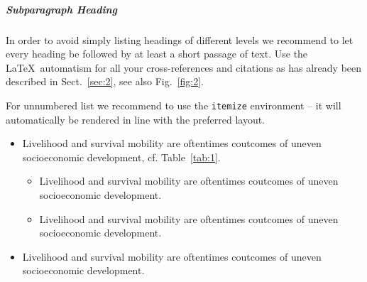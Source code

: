 \documentclass[graybox]{svmult}
\begin{document}
\subparagraph{Subparagraph Heading} In order to avoid simply listing headings of different levels we recommend to let every heading be followed by at least a short passage of text. Use the \LaTeX\ automatism for all your cross-references and citations as has already been described in Sect.~\ref{sec:2}, see also Fig.~\ref{fig:2}.

For unnumbered list we recommend to use the \verb|itemize| environment -- it will automatically be rendered in line with the preferred layout.

\begin{itemize}
\item{Livelihood and survival mobility are oftentimes coutcomes of uneven socioeconomic development, cf. Table~\ref{tab:1}.}
\begin{itemize}
\item{Livelihood and survival mobility are oftentimes coutcomes of uneven socioeconomic development.}
\item{Livelihood and survival mobility are oftentimes coutcomes of uneven socioeconomic development.}
\end{itemize}
\item{Livelihood and survival mobility are oftentimes coutcomes of uneven socioeconomic development.}
\end{itemize}
\end{document}
